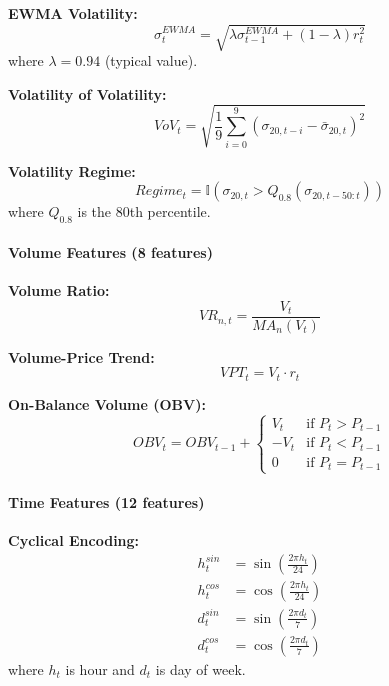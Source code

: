 \documentclass[12pt,a4paper]{article}
\begin{document}
\textbf{EWMA Volatility:}
\begin{equation}
\sigma_t^{EWMA} = \sqrt{\lambda \sigma_{t-1}^{EWMA} + (1-\lambda) r_t^2}
\end{equation}
where $\lambda = 0.94$ (typical value).

\textbf{Volatility of Volatility:}
\begin{equation}
VoV_t = \sqrt{\frac{1}{9}\sum_{i=0}^{9} (\sigma_{20,t-i} - \bar{\sigma}_{20,t})^2}
\end{equation}

\textbf{Volatility Regime:}
\begin{equation}
Regime_t = \mathbb{I}(\sigma_{20,t} > Q_{0.8}(\sigma_{20,t-50:t}))
\end{equation}
where $Q_{0.8}$ is the 80th percentile.

\paragraph{Volume Features (8 features)}

\textbf{Volume Ratio:}
\begin{equation}
VR_{n,t} = \frac{V_t}{MA_n(V_t)}
\end{equation}

\textbf{Volume-Price Trend:}
\begin{equation}
VPT_t = V_t \cdot r_t
\end{equation}

\textbf{On-Balance Volume (OBV):}
\begin{equation}
OBV_t = OBV_{t-1} + \begin{cases}
V_t & \text{if } P_t > P_{t-1} \\
-V_t & \text{if } P_t < P_{t-1} \\
0 & \text{if } P_t = P_{t-1}
\end{cases}
\end{equation}

\paragraph{Time Features (12 features)}

\textbf{Cyclical Encoding:}
\begin{align}
h_t^{sin} &= \sin\left(\frac{2\pi h_t}{24}\right) \\
h_t^{cos} &= \cos\left(\frac{2\pi h_t}{24}\right) \\
d_t^{sin} &= \sin\left(\frac{2\pi d_t}{7}\right) \\
d_t^{cos} &= \cos\left(\frac{2\pi d_t}{7}\right)
\end{align}
where $h_t$ is hour and $d_t$ is day of week.
\end{document}
